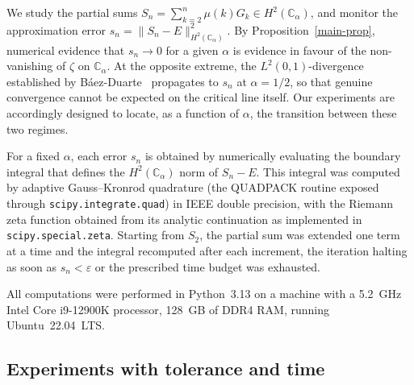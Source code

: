 \documentclass[11pt]{extarticle}
\numberwithin{equation}{section}
\theoremstyle{plain}
\theoremstyle{definition}
\begin{document}
We study the partial sums $ S_n = \sum_{k=2}^{n} \mu(k)G_k \in H^2(\mathbb{C}_\alpha)$,
and monitor the approximation error $s_n = \|S_n - E\|^2_{H^2(\mathbb{C}_\alpha)}$.
By Proposition~\ref{main-prop}, numerical evidence that $s_n \to 0$ for a given
$\alpha$ is evidence in favour of the non-vanishing of $\zeta$ on $\mathbb{C}_\alpha$.
At the opposite extreme, the $L^2(0,1)$-divergence established by
B\'aez-Duarte~\cite{baez-unitary} propagates to $s_n$ at $\alpha = 1/2$, so that
genuine convergence cannot be expected on the critical line itself. Our experiments
are accordingly designed to locate, as a function of $\alpha$, the transition
between these two regimes.

For a fixed $\alpha$, each error $s_n$ is obtained by numerically evaluating the
boundary integral that defines the $H^2(\mathbb{C}_\alpha)$ norm of $S_n - E$.
This integral was computed by adaptive Gauss--Kronrod quadrature (the QUADPACK
routine exposed through \texttt{scipy.integrate.quad}) in IEEE double precision,
with the Riemann zeta function obtained from its analytic continuation as
implemented in \texttt{scipy.special.zeta}. Starting from $S_2$, the partial sum
was extended one term at a time and the integral recomputed after each increment,
the iteration halting as soon as $s_n < \varepsilon$ or the prescribed time budget
was exhausted.

All computations were performed in Python~3.13 on a machine with a 5.2~GHz
Intel Core i9-12900K processor, 128~GB of DDR4 RAM, running Ubuntu~22.04~LTS.



\subsection{Experiments with tolerance and time}\label{subsec:tol}
\end{document}
